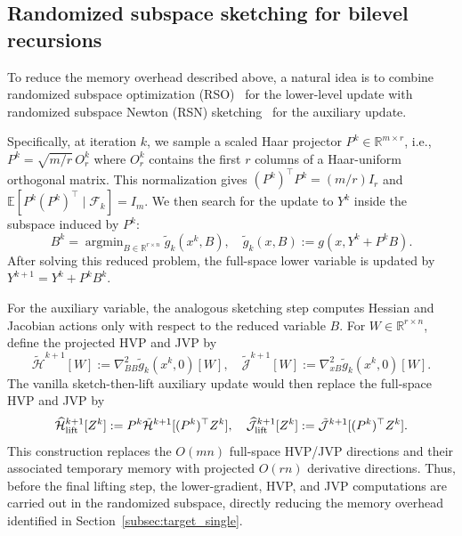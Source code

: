 \documentclass{pkumelon}
\theoremstyle{plain}
\newcommand{\E}{\mathbb{E}}
\DeclareMathOperator{\argmin}{argmin}
\begin{document}
\subsection{Randomized subspace sketching for bilevel recursions}
\label{subsec:projection_single}

To reduce the memory overhead described above, a natural idea is to combine randomized subspace optimization (RSO)~\citep{he2024subspace,chen2025memory} for the lower-level update with randomized subspace Newton (RSN) sketching~\citep{gower2019rsn} for the auxiliary update.

Specifically, at iteration $k$, we sample a scaled Haar projector $P^k\in\mathbb R^{m\times r}$, i.e., $P^k=\sqrt{m/r}\,O_r^k$ where $O_r^k$ contains the first $r$ columns of a Haar-uniform orthogonal matrix. This normalization gives $(P^k)^\top P^k=(m/r)I_r$ and $\E[P^k(P^k)^\top\mid\mathcal F_k]=I_m$. We then search for the update to $Y^k$ inside the subspace induced by $P^k$:
\begin{equation}
\label{eq:rso_lower_subproblem}
B^k= \argmin_{B\in\mathbb R^{r\times n}}\tilde g_k(x^k,B), \quad \tilde g_k(x,B):=g(x,Y^k+P^kB).
\end{equation}
After solving this reduced problem, the full-space lower variable is updated by $Y^{k+1}=Y^k+P^kB^k$.

For the auxiliary variable, the analogous sketching step computes Hessian and Jacobian actions only with respect to the reduced variable $B$. For $W\in\mathbb R^{r\times n}$, define the projected HVP and JVP by
\begin{equation}
\label{eq:projected_hvp_jvp_main}
\tilde{\mathcal H}^{k+1}[W]:=\nabla_{BB}^2\tilde g_k(x^k,0)[W], \quad \tilde{\mathcal J}^{k+1}[W]:=\nabla_{xB}^2\tilde g_k(x^k,0)[W].
\end{equation}
The vanilla sketch-then-lift auxiliary update would then replace the full-space HVP and JVP by
\begin{equation}
\label{eq:naive_projected_hvp}
\widehat{\mathcal H}_{\rm lift}^{k+1}[Z^k]:=P^k\tilde{\mathcal H}^{k+1}[(P^k)^\top Z^k], \quad \widehat{\mathcal J}_{\rm lift}^{k+1}[Z^k]:=\tilde{\mathcal J}^{k+1}[(P^k)^\top Z^k].
\end{equation}
This construction replaces the $O(mn)$ full-space HVP/JVP directions and their associated temporary memory with projected $O(rn)$ derivative directions. Thus, before the final lifting step, the lower-gradient, HVP, and JVP computations are carried out in the randomized subspace, directly reducing the memory overhead identified in Section~\ref{subsec:target_single}.
\end{document}
